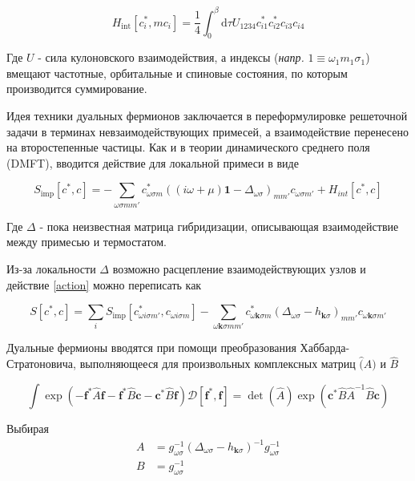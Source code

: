 \documentclass[11pt,a4paper]{report}
\begin{document}
\begin{equation}
 H_{\text{int}}[c^*_i,mc_i] = \frac{1}{4} \int_0^\beta \mathrm{d}\tau U_{1234} c_{i1}^* c_{i2}^* c_{i3} c_{i4}
\end{equation}

Где $U$ - сила кулоновского взаимодействия, а индексы (\textit{напр.} $1\equiv{\omega_1 m_1\sigma_1}$) вмещают частотные, орбитальные и спиновые состояния, по которым производится суммирование.

Идея техники дуальных фермионов заключается в переформулировке решеточной задачи в терминах невзаимодействующих примесей, а взаимодействие перенесено на второстепенные частицы.
Как и в теории динамического среднего поля (DMFT), вводится действие для локальной примеси в виде

\begin{equation}
 S_{\text{imp}}[c^*,c] = - \sum_{\omega\sigma m m'}c^*_{\omega\sigma m}((i\omega+\mu)\mathbf{1}-\Delta_{\omega\sigma})_{mm'}c_{\omega\sigma m'} + H_{int}[c^*,c]
\end{equation}

Где $\Delta$ - пока неизвестная матрица гибридизации, описывающая взаимодействие между примесью и термостатом.

Из-за локальности $\Delta$ возможно расцепление взаимодействующих узлов и действие \ref{action} можно переписать как

\begin{equation}
 S[c^*,c] = \sum_i S_{\text{imp}}[c^*_{\omega i \sigma m'},c_{\omega i\sigma m}] - \sum_{\omega\mathbf{k}\sigma mm'}c^*_{\omega\mathbf{k}\sigma m}(\Delta_{\omega\sigma}-h_{\mathbf{k}\sigma})_{mm'}c_{\omega\mathbf{k}\sigma m'}
\end{equation}

Дуальные фермионы вводятся при помощи преобразования Хаббарда-Стратоновича, выполняющееся для произвольных комплексных матриц $\hat(A)$ и $\hat{B}$

\begin{equation}
 \int \exp{(-\mathbf{f}^*\hat{A}\mathbf{f}-\mathbf{f}^*\hat{B}\mathbf{c}-\mathbf{c}^*\hat{B}\mathbf{f})}\mathcal{D}[\mathbf{f}^*,\mathbf{f}] = \det{(\hat{A})}\exp{(\mathbf{c}^*\hat{B}\hat{A}^{-1}\hat{B}\mathbf{c})}
\end{equation}

Выбирая 
\begin{equation}
\begin{split}
 A &= g_{\omega\sigma}^{-1}(\Delta_{\omega\sigma}-h_{\mathbf{k}\sigma})^{-1} g_{\omega\sigma}^{-1} \\
 B &= g_{\omega\sigma}^{-1}
\end{split}
\end{equation}
\end{document}
